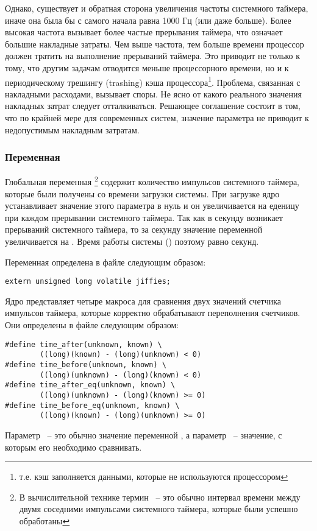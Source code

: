 Однако, существует и обратная сторона увеличения частоты системного таймера, иначе она была бы с самого начала равна
1000 Гц (или даже больше). Более высокая частота вызывает более частые прерывания таймера, что означает большие накладные
затраты. Чем выше частота, тем больше времени процессор должен тратить на выполнение прерываний таймера. Это приводит
не только к тому, что другим задачам отводится меньше процессорного времени, но и к периодическому трешингу (trashing) кэша
процессора\footnote{т.е. кэш заполняется данными, которые не используются процессором}. Проблема, связанная
с накладными расходами, вызывает споры. Не ясно от какого  реального значения накладных затрат следует отталкиваться.
Решающее соглашение состоит в том, что по крайней мере для современных систем, значение параметра 
не приводит к недопустимым накладным затратам.

\subsubsection{Переменная }
Глобальная переменная \footnote{В вычислительной технике термин ~-- это обычно интервал
времени между двумя соседними импульсами системного таймера, которые были успешно обработаны} 
содержит количество импульсов системного таймера, которые были получены
со времени загрузки системы. При загрузке ядро устанавливает значение этого параметра в нуль и он увеличивается
на еденицу при каждом прерывании системного таймера. Так как в секунду возникает  прерываний
системного таймера, то за секунду значение переменной  увеличивается на . Время работы
системы () поэтому равно  секунд.
\newpar

Переменная  определена в файле  следующим образом:
\begin{lstlisting}
extern unsigned long volatile jiffies;
\end{lstlisting}
Ядро представляет четыре макроса для сравнения двух значений счетчика импульсов таймера,
которые корректно обрабатывают переполнения счетчиков. Они определены в файле
 следующим образом:
\begin{lstlisting} 
#define time_after(unknown, known) \     
		((long)(known) - (long)(unknown) < 0)
#define time_before(unknown, known) \
		((long)(unknown) - (long)(known) < 0)
#define time_after_eq(unknown, known) \   
		((long)(unknown) - (long)(known) >= 0)
#define time_before_eq(unknown, known) \
		((long)(known) - (long)(unknown) >= 0)
\end{lstlisting}
Параметр \src{unknown}~-- это обычно значение переменной , а параметр
\src{known}~-- значение, с которым его необходимо сравнивать.
\newpar

